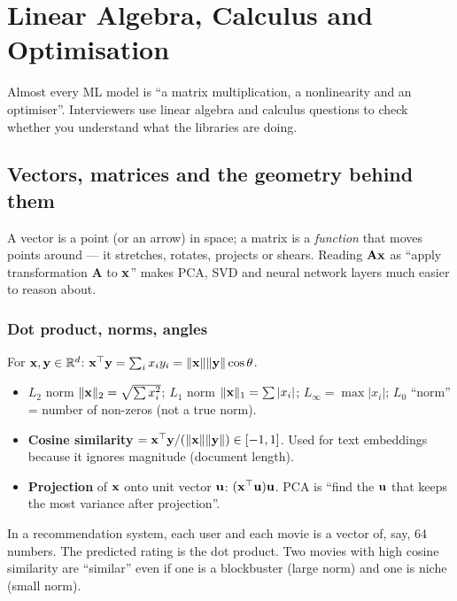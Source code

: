 \chapter{Linear Algebra, Calculus and Optimisation}

Almost every ML model is ``a matrix multiplication, a nonlinearity and an optimiser''. Interviewers use linear algebra and calculus questions to check whether you understand what the libraries are doing.

\section{Vectors, matrices and the geometry behind them}

\begin{intuition}
A vector is a point (or an arrow) in space; a matrix is a \emph{function} that moves points around --- it stretches, rotates, projects or shears. Reading $\mathbf{A}\mathbf{x}$ as ``apply transformation $\mathbf{A}$ to $\mathbf{x}$'' makes PCA, SVD and neural network layers much easier to reason about.
\end{intuition}

\subsection{Dot product, norms, angles}
For $\mathbf{x},\mathbf{y}\in\mathbb{R}^d$: $\mathbf{x}^\top\mathbf{y}=\sum_i x_iy_i=\|\mathbf{x}\|\|\mathbf{y}\|\cos\theta$.
\begin{itemize}
  \item $L_2$ norm $\|\mathbf{x}\|_2=\sqrt{\sum x_i^2}$; $L_1$ norm $\|\mathbf{x}\|_1=\sum|x_i|$; $L_\infty=\max|x_i|$; $L_0$ ``norm'' = number of non-zeros (not a true norm).
  \item \textbf{Cosine similarity} $=\mathbf{x}^\top\mathbf{y}/(\|\mathbf{x}\|\|\mathbf{y}\|)\in[-1,1]$. Used for text embeddings because it ignores magnitude (document length).
  \item \textbf{Projection} of $\mathbf{x}$ onto unit vector $\mathbf{u}$: $(\mathbf{x}^\top\mathbf{u})\mathbf{u}$. PCA is ``find the $\mathbf{u}$ that keeps the most variance after projection''.
\end{itemize}

\begin{realworld}
In a recommendation system, each user and each movie is a vector of, say, 64 numbers. The predicted rating is the dot product. Two movies with high cosine similarity are ``similar'' even if one is a blockbuster (large norm) and one is niche (small norm).
\end{realworld}

